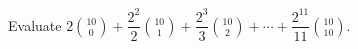 Evaluate $2\binom{10}0+\dfrac{2^2}2\binom{10}1+\dfrac{2^3}3\binom{10}2+\cdots+\dfrac{2^{11}}{11}\binom{10}{10}$.
